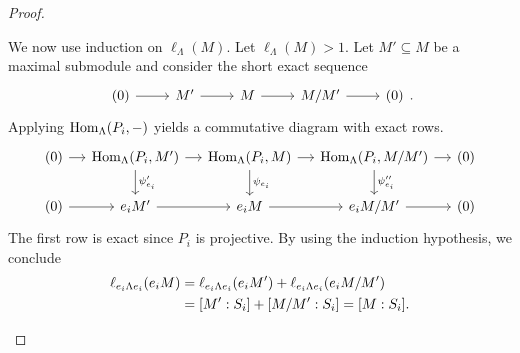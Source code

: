 \begin{proof}
\begin{enumerate}
We now use induction on $\ell_\Lambda(M)$. Let $\ell_\Lambda(M)>1$. Let $M'\subseteq M$ be a maximal submodule and consider the short exact sequence
\[
\begin{tikzcd}
	(0) \ar[r] & M' \ar[r] & M \ar[r] & M/M' \ar[r] & (0)
\end{tikzcd}.
\]
Applying $\operatorname{Hom}_\Lambda(P_i,-)$ yields a commutative diagram with exact rows.
\[
\begin{tikzcd}[column sep=small]
	(0) \ar[r] & \Hom_\Lambda(P_i,M') \ar[r] \ar[d,"\psi_{e_i}'"] & \Hom_\Lambda(P_i,M) \ar[r] \ar[d,"\psi_{e_i}"] & \Hom_\Lambda(P_i,M/M') \ar[r] \ar[d,"\psi_{e_i}''"] & (0) \\
	(0) \ar[r] & e_i M' \ar[r] & e_i M \ar[r] & e_i M/M' \ar[r] & (0)
\end{tikzcd}
\]
The first row is exact since $P_i$ is projective. By using the induction hypothesis, we conclude
\begin{align*}
\ell_{e_i \Lambda e_i}(e_i M)
& = \ell_{e_i \Lambda e_i}(e_i M') + \ell_{e_i \Lambda e_i}(e_i M/M') \\
& = [M':S_i] + [M/M':S_i]
  = [M:S_i].\qedhere
\end{align*}
\end{enumerate}
\end{proof}


